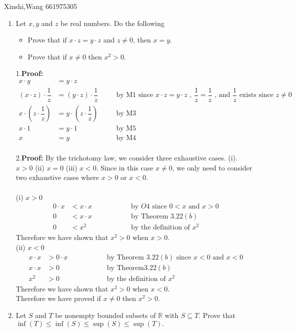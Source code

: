 \documentclass{article}
\begin{document}
\noindent Xinshi,Wang 661975305\\
\bigskip
\bigskip


\begin{enumerate}
\item Let $x,y$ and $z$ be real numbers.  Do the following
\begin{itemize}
\item Prove that if $x \cdot z = y \cdot z$ and $z \neq 0$, then $x = y$.
\item Prove that if $x \neq 0$ then $x^2 > 0$.
\end{itemize}
\bigskip
\vspace{.15in}
{1.\bf Proof:}
\begin{align*}
x \cdot y &= y \cdot z  ~~~~~~~~~~~~~~~~~~&&\\
(x \cdot z) \cdot \dfrac{1}{z} &= (y \cdot z) \cdot \dfrac{1}{z} &&\text{by M1 since } x \cdot z = y \cdot z \text{ , } \dfrac{1}{z} = \dfrac{1}{z} \text{ , and } \dfrac{1}{z} \text{ exists since } z \neq 0\\
x \cdot (z \cdot \dfrac{1}{z}) &= y \cdot (z \cdot \dfrac{1}{z}) &&\text{by M3}\\
x \cdot 1 &= y \cdot 1 &&\text{by M5}\\
x  &= y &&\text{by M4}\\
\end{align*}
\bigskip
\bigskip

{2.\bf Proof:}
 By the trichotomy law, we consider three exhaustive cases. (i). $x>0$ (ii) $x=0$ (iii) $x<0$. Since in this case $x \neq 0$, we only need to consider two exhaustive cases where $x>0$ or $x<0$.\\\\
 (i) $x>0$
\begin{align*}
	0 \cdot x &< x \cdot x ~~~~~~~~~~~~~~~~~~&&\text{by } O4 \text{ since } 0<x \text{ and } x>0\\
	0 &< x \cdot x &&\text{by Theorem } 3.22(b) \\
	0 &< x^2&&\text{by the definition of }x^2
\end{align*}
\indent Therefore we have shown that $x^2>0$ when $x>0$.\\
 (ii) $x<0$
\begin{align*}
	x \cdot x &> 0 \cdot x~~~~~~~~~~~~~~~~~~&&\text{by Theorem } 3.22(b) \text{ since } x<0 \text{ and } x<0 \\
	x \cdot x &> 0 &&\text{by Theorem} 3.22(b) \\
	x^2 &> 0 &&\text{by the definition of }x^2
\end{align*}
\indent Therefore we have shown that $x^2>0$ when $x<0$.\\
Therefore we have proved if $x \neq 0$ then $x^2 > 0$.\\
\bigskip
\item Let $S$ and $T$ be nonempty bounded subsets of $\mathbb{R}$ with $S \subseteq T$.
Prove that $\inf(T) \le \inf(S)  \le \sup(S) \le \sup(T).$\\  
\vspace{.15in}


\end{enumerate}
\end{document}
